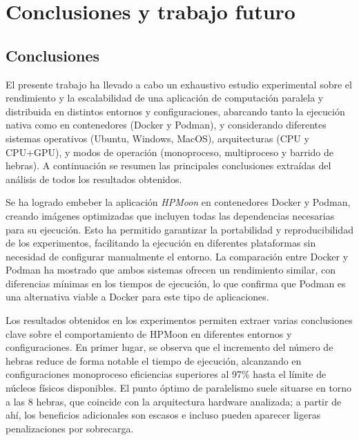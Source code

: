 \chapter{Conclusiones y trabajo futuro}\label{cap:conclusiones}


\section{Conclusiones}


El presente trabajo ha llevado a cabo un exhaustivo estudio experimental sobre el rendimiento y la escalabilidad de una aplicación de computación paralela y distribuida en distintos entornos y configuraciones, abarcando tanto la ejecución nativa como en contenedores (Docker y Podman), y considerando diferentes sistemas operativos (Ubuntu, Windows, MacOS), arquitecturas (CPU y CPU+GPU), y modos de operación (monoproceso, multiproceso y barrido de hebras). A continuación se resumen las principales conclusiones extraídas del análisis de todos los resultados obtenidos.

Se ha logrado embeber la aplicación \textit{HPMoon} en contenedores Docker y Podman, creando imágenes optimizadas que incluyen todas las dependencias necesarias para su ejecución. Esto ha permitido garantizar la portabilidad y reproducibilidad de los experimentos, facilitando la ejecución en diferentes plataformas sin necesidad de configurar manualmente el entorno. La comparación entre Docker y Podman ha mostrado que ambos sistemas ofrecen un rendimiento similar, con diferencias mínimas en los tiempos de ejecución, lo que confirma que Podman es una alternativa viable a Docker para este tipo de aplicaciones.

Los resultados obtenidos en los experimentos permiten extraer varias conclusiones clave sobre el comportamiento de HPMoon en diferentes entornos y configuraciones. En primer lugar, se observa que el incremento del número de hebras reduce de forma notable el tiempo de ejecución, alcanzando en configuraciones monoproceso eficiencias superiores al 97\% hasta el límite de núcleos físicos disponibles. El punto óptimo de paralelismo suele situarse en torno a las 8 hebras, que coincide con la arquitectura hardware analizada; a partir de ahí, los beneficios adicionales son escasos e incluso pueden aparecer ligeras penalizaciones por sobrecarga.


